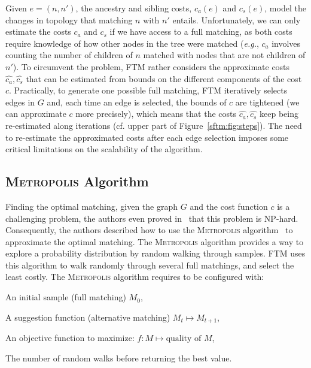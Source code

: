 Given $e=(n, n')$, the ancestry and sibling costs, $c_a(e)$ and $c_s(e)$, model the changes in topology that matching $n$ with $n'$ entails.
Unfortunately, we can only estimate the costs $c_a$ and $c_s$ if we have access to a full matching, as both costs require knowledge of how other nodes in the tree were matched (\emph{e.g.}, $c_a$ involves counting the number of children of $n$ matched with nodes that are not children of $n'$).
To circumvent the problem, FTM rather considers the approximate costs $\hat{c_a}, \hat{c_s}$ that can be estimated from bounds on the different components of the cost $c$.
Practically, to generate one possible full matching, FTM iteratively selects edges in $G$ and, each time an edge is selected, the bounds of $c$ are tightened (we can approximate $c$ more precisely), which means that the costs $\hat{c_a}, \hat{c_s}$ keep being re-estimated along iterations (cf. upper part of Figure~\ref{sftm:fig:steps}).
The need to re-estimate the approximated costs after each edge selection imposes some critical limitations on the scalability of the algorithm.

\subsection{\textsc{Metropolis} Algorithm}\label{sftm:sec:metropolis_ftm}%
Finding the optimal matching, given the graph $G$ and the cost function $c$ is a challenging problem, the authors even proved in~\cite{Kumar2011_FTM} that this problem is NP-hard.
Consequently, the authors described how to use the \textsc{Metropolis} algorithm~\cite{metropolis1953equation} to approximate the optimal matching. 
The \textsc{Metropolis} algorithm provides a way to explore a probability distribution by random walking through samples.
FTM uses this algorithm to walk randomly through several full matchings, and select the least costly.
The \textsc{Metropolis} algorithm requires to be configured with:
\begin{compactenum}
    \item An initial sample (full matching) $M_0$,
    \item A suggestion function (alternative matching) $M_t \mapsto M_{t+1}$,
    \item An objective function to maximize: $f: M \mapsto \text{quality of } M$,
    \item The number of random walks before returning the best value.
\end{compactenum}

